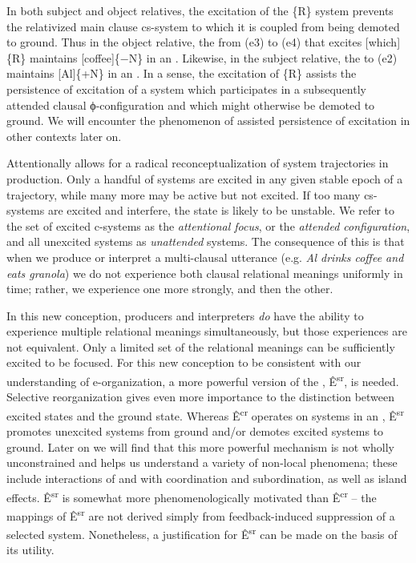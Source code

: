   In both subject and object relatives, the excitation of the \{R\} system prevents the relativized main clause cs-system to which it is coupled from being demoted to ground. Thus in the object relative, the  from (e3) to (e4) that excites [which]\{R\} maintains [coffee]\{−N\} in an . Likewise, in the subject relative, the  to (e2) maintains [Al]\{+N\} in an . In a sense, the excitation of \{R\} assists the persistence of excitation of a system which participates in a subsequently attended clausal ϕ-con\-fig\-u\-ra\-tion and which might otherwise be demoted to ground. We will encounter the phenomenon of assisted persistence of excitation in other contexts later on.

Attentionally  allows for a radical reconceptualization of system trajectories in production.  Only a handful of systems are excited in any given stable epoch of a trajectory, while many more may be active but not excited. If too many cs-systems are excited and interfere, the state is likely to be unstable. We refer to the set of excited c-systems as the \textit{attentional focus}, or the \textit{attended configuration}, and all unexcited systems as \textit{unattended} systems. The consequence of this is that when we produce or interpret a multi-clausal utterance (e.g. \textit{Al drinks coffee and eats granola}) we do not experience both clausal relational meanings uniformly in time; rather, we experience one  more strongly, and then the other.

  In this new conception, producers and interpreters \textit{do} have the ability to experience multiple relational meanings simultaneously, but those experiences are not equivalent. Only a limited set of the relational meanings can be sufficiently excited to be  focused. For this new conception to be consistent with our understanding of e-organization, a more powerful version of the , Ê\textsuperscript{sr},  is needed. Selective reorganization gives even more importance to the distinction between excited states and the ground state. Whereas Ê\textsuperscript{cr} operates on systems in an , Ê\textsuperscript{sr} promotes unexcited systems from ground and/or demotes excited systems to ground. Later on we will find that this more powerful mechanism is not wholly unconstrained and helps us understand a variety of non-local phenomena; these include interactions of  and  with coordination and subordination, as well as island effects. Ê\textsuperscript{sr} is somewhat more phenomenologically motivated than Ê\textsuperscript{cr} -- the mappings of Ê\textsuperscript{sr} are not derived simply from feedback-induced suppression of a selected system. Nonetheless, a justification for Ê\textsuperscript{sr} can be made on the basis of its utility.

